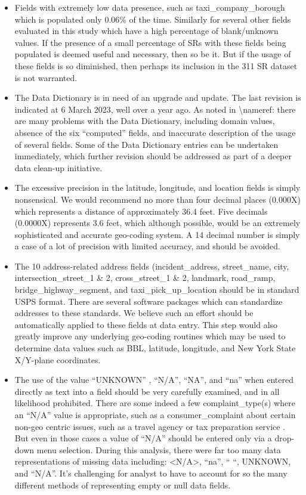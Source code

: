 \documentclass[12pt, titlepage]{article}
\begin{document}
{\begin{itemize}
	\item Fields with extremely low data presence, such as taxi\_company\_borough 
	which is populated only 0.06\% of the time. Similarly for several other 
	fields evaluated in this study which have a high percentage of blank/unknown 
	values. If the presence of a small percentage of SRs with these fields 
	being populated is deemed useful and necessary, then so be it. But if 
	the usage of these fields is so diminished, then perhaps its inclusion 
	in the 311 SR dataset is not warranted.
	
	\item The Data Dictionary is in need of an upgrade and update. The last 
	revision is indicated at 6 March 2023, well over a year ago. 	As noted 
	in \textbackslash nameref:  there are many 
	problems with the Data Dictionary, including domain values, absence of 
	the six ``computed'' fields, and inaccurate description of the usage of 
	several fields. Some of the Data Dictionary entries can be undertaken 
	immediately, which further revision should be addressed as part of 
	a deeper data clean-up initiative. 
	
	\item The excessive precision in the latitude, longitude, and location 
	fields is simply nonsensical.  We would recommend no more than 
	four decimal places (0.000X) which represents a distance of approximately 
	36.4 feet. Five decimals (0.0000X) represents 3.6 feet, which although 
	possible, would be an extremely sophisticated and accurate 
	geo-coding system. A 14 decimal number is simply a case of a lot 
	of precision with limited accuracy, and should be avoided.

	\item The 10 address-related address fields (incident\_address, 
	street\_name, city, intersection\_street\_1 \& 2, cross\_street\_1 \& 2,  
	landmark, road\_ramp, bridge\_highway\_segment, and 
	taxi\_pick\_up\_location should be in standard USPS format. There 
	are several software packages which can standardize addresses to 
	these standards. We believe such an effort should be automatically 
	applied to these fields at data entry. This step would also greatly 
	improve any underlying geo-coding routines which 	may be used 
	to determine data values such as BBL, latitude, longitude, and New 
	York State X/Y-plane coordinates.
	
	\item The use of the value ``UNKNOWN'' , ``N/A'', ``NA'', and ``na'' when 
	entered directly as text into a field should be very carefully examined, 
	and in all likelihood prohibited.  There are some indeed a few 
	complaint\_type(s) where an ``N/A'' value is appropriate, such 
	as a consumer\_complaint about certain non-geo centric issues, such 
	as a travel agency or tax preparation service . But even in those cases 
	a value of ``N/A'' should be entered only via a drop-down menu 
	selection. During this analysis, there were far too many data 
	representations of missing data including: <N/A>, ``na'', `` ``, UNKNOWN, 
	and ``N/A''. It's challenging for analyst to have to account for so 
	the many different methods of representing empty or null data fields. 
	

\end{itemize}}
\end{document}
